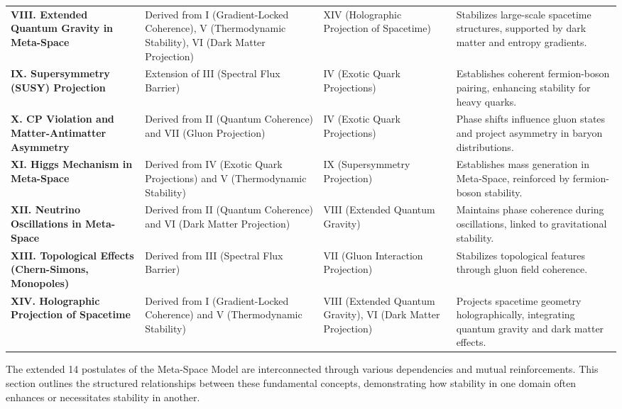 \documentclass[10.5pt,a4paper]{article}
\begin{document}
\begin{landscape}
\begin{tabularx}{\linewidth}{>{\bfseries}X X X X}
\textbf{VIII. Extended Quantum Gravity in Meta-Space} &
Derived from I (Gradient-Locked Coherence), V (Thermodynamic Stability), VI (Dark Matter Projection) &
XIV (Holographic Projection of Spacetime) &
Stabilizes large-scale spacetime structures, supported by dark matter and entropy gradients. \\

\textbf{IX. Supersymmetry (SUSY) Projection} &
Extension of III (Spectral Flux Barrier) &
IV (Exotic Quark Projections) &
Establishes coherent fermion-boson pairing, enhancing stability for heavy quarks. \\

\textbf{X. CP Violation and Matter-Antimatter Asymmetry} &
Derived from II (Quantum Coherence) and VII (Gluon Projection) &
IV (Exotic Quark Projections) &
Phase shifts influence gluon states and project asymmetry in baryon distributions. \\

\textbf{XI. Higgs Mechanism in Meta-Space} &
Derived from IV (Exotic Quark Projections) and V (Thermodynamic Stability) &
IX (Supersymmetry Projection) &
Establishes mass generation in Meta-Space, reinforced by fermion-boson stability. \\

\textbf{XII. Neutrino Oscillations in Meta-Space} &
Derived from II (Quantum Coherence) and VI (Dark Matter Projection) &
VIII (Extended Quantum Gravity) &
Maintains phase coherence during oscillations, linked to gravitational stability. \\

\textbf{XIII. Topological Effects (Chern-Simons, Monopoles)} &
Derived from III (Spectral Flux Barrier) &
VII (Gluon Interaction Projection) &
Stabilizes topological features through gluon field coherence. \\

\textbf{XIV. Holographic Projection of Spacetime} &
Derived from I (Gradient-Locked Coherence) and V (Thermodynamic Stability) &
VIII (Extended Quantum Gravity), VI (Dark Matter Projection) &
Projects spacetime geometry holographically, integrating quantum gravity and dark matter effects. \\

\bottomrule
\end{tabularx}

\end{landscape}


The extended 14 postulates of the Meta-Space Model are interconnected through various dependencies and mutual reinforcements. 
This section outlines the structured relationships between these fundamental concepts, demonstrating how stability in one domain 
often enhances or necessitates stability in another.
\end{document}
